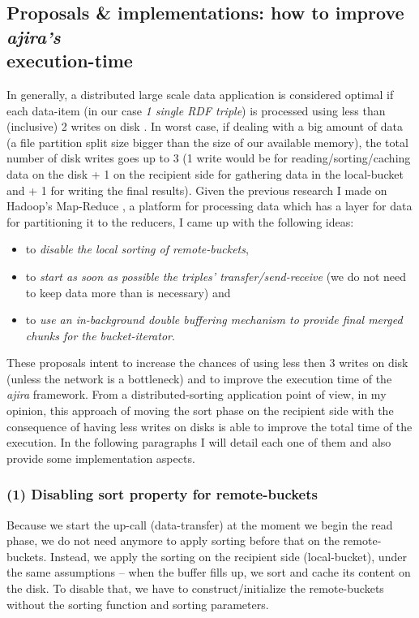 % 
\subsection{Proposals \& implementations: how to improve \textit{ajira's} \\ execution-time}

In generally, a distributed large scale data application is considered optimal if each data-item (in our case \textit{1 single RDF triple}) is processed using less than (inclusive) 2 writes on disk \cite{tritonsort}. In worst case, if dealing with a big amount of data (a file partition split size bigger than the size of our available memory), the total number of disk writes goes up to 3 (1 write would be for reading/sorting/caching data on the disk + 1 on the recipient side for gathering data in the local-bucket and + 1 for writing the final results). Given the previous research I made on Hadoop's Map-Reduce \cite{hadoop}, a platform for processing data which has a layer for data \cite{shuffling} for partitioning it to the reducers, I came up with the following ideas: 
\begin{itemize}
\item to \textit{disable the local sorting of remote-buckets},
\item to \textit{start as soon as possible the triples' transfer/send-receive} (we do not need to keep data more than is necessary) and
\item to \textit{use an in-background double buffering mechanism to provide final merged chunks for the bucket-iterator}. 
\end{itemize}

These proposals intent to increase the chances of using less then 3 writes on disk (unless the network is a bottleneck) and to improve the execution time of the \textit{ajira} framework. From a distributed-sorting application point of view, in my opinion, this approach of moving the sort phase on the recipient side with the consequence of having less writes on disks is able to improve the total time of the execution. In the following paragraphs I will detail each one of them and also provide some implementation aspects.

% 
\subsubsection*{(1) Disabling sort property for remote-buckets}

Because we start the up-call (data-transfer) at the moment we begin the read phase, we do not need anymore to apply sorting before that on the remote-buckets. Instead, we apply the sorting on the recipient side (local-bucket), under the same assumptions -- when the buffer fills up, we sort and cache its content on the disk. To disable that, we have to construct/initialize the remote-buckets without the sorting function and sorting parameters.

